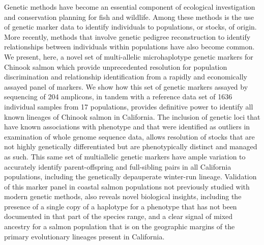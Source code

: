 

Genetic methods have become an essential component of ecological investigation
and conservation planning for fish and wildlife. Among these methods is the use
of genetic marker data to identify individuals to
populations, or stocks, of origin. More recently, methods that involve genetic
pedigree reconstruction to identify relationships between individuals within populations
have also become common. We present, here, a novel set of
multi-allelic microhaplotype genetic markers for Chinook salmon which provide unprecedented
resolution for population discrimination and relationship identification from a rapidly and
economically assayed panel of markers. We show how this set of genetic markers assayed
by sequencing of 204 amplicons, in tandem with a reference data set of 1636 individual
samples from 17 populations, 
provides definitive power to identify all known lineages of Chinook salmon in
California. The inclusion of genetic loci that have known associations with phenotype
and that were identified as outliers in examination of whole genome sequence data,
allows resolution of stocks that are not highly genetically differentiated but
are phenotypically distinct and managed as such. 
This same set of multiallelic genetic markers have ample variation to
accurately identify parent-offspring and full-sibling
pairs in all California populations, including the genetically depauperate winter-run
lineage.
Validation of this marker panel in coastal salmon populations not previously studied with
modern genetic methods, also reveals novel biological insights, including
the presence of a single copy of a haplotype for a phenotype that has not
been documented in that part of the species range, and a clear signal of mixed
ancestry for a salmon population that is on the geographic margins of the 
primary evolutionary lineages present in California.
